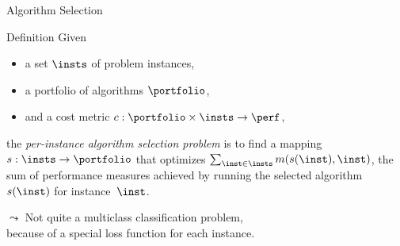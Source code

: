 \begin{frame}[c]{Algorithm Selection~}

\begin{block}{Definition}
Given 
\begin{itemize}
  \item a set $\insts$ of problem instances,
  \item a portfolio of algorithms $\portfolio$,
  \item and a cost metric $c:  \portfolio \times \insts \rightarrow \perf$,   
\end{itemize}
 
the \emph{per-instance algorithm selection problem} is to find a mapping 
$s: \insts \rightarrow \portfolio$ 
that optimizes $\sum_{\inst \in \insts} m(s(\inst),\inst)$, 
the sum of performance measures achieved by running the selected algorithm $s(\inst)$ for instance~$\inst$.
\end{block}

\bigskip
\pause

$\leadsto$ \alert{Not quite a multiclass classification problem,\\ because of a special loss function for each instance.}

\end{frame}


